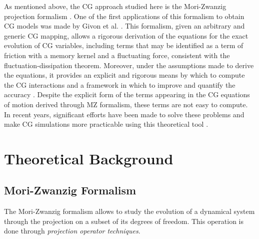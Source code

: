 \documentclass[10pt,a4paper]{book}
\theoremstyle{definition}
\begin{document}
As mentioned above, the CG approach studied here is the Mori-Zwanzig projection formalism \cite{Mori1965,Zwanzig1973}. One of the first applications of this formalism to obtain CG models was made by Givon et al. \cite{Givon2004}. This formalism, given an arbitrary and generic CG mapping, allows a rigorous derivation of the equations for the exact evolution of CG variables, including terms that may be identified as a term of friction with a memory kernel and a fluctuating force, consistent with the fluctuation-dissipation theorem. Moreover, under the assumptions made to derive the equations, it provides an explicit and rigorous means by which to compute the CG interactions and a framework in which to improve and quantify the accuracy \cite{DiPasquale2019}.
Despite the explicit form of the terms appearing in the CG equations of motion derived through MZ formalism, these terms are not easy to compute. In recent years, significant efforts have been made to solve these problems and make CG simulations more practicable using this theoretical tool \cite{DiPasquale2019,Espanol2009,Hijon2010,Izvekov2017,Jung2017,Li2015,Wang2019,Yuanran2018}.



\part{Theoretical Background}

\chapter{Mori-Zwanzig Formalism}
The Mori-Zwanzig formalism allows to study the evolution of a dynamical system through the projection on a subset of its degrees of freedom. This operation is done through \emph{projection operator techniques}.
\end{document}
